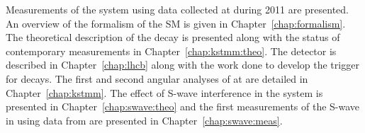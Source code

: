 Measurements of the \BdToKpimm system using data collected at \lhcb during 2011 are presented.
An overview of the formalism of the SM is given in Chapter~\ref{chap:formalism}. %
The theoretical description of the \BdToKpill decay is presented along with the status of contemporary measurements in  Chapter~\ref{chap:kstmm:theo}.
The \lhcb detector is described in Chapter~\ref{chap:lhcb} along with the work done to develop the trigger for \BdToKstmm decays.
The first and second angular analyses of \BdToKstmm at \lhcb %
are detailed in Chapter~\ref{chap:kstmm}.
The effect of S-wave interference in the \BdToKpill system is presented in Chapter~\ref{chap:swave:theo} and the first measurements of the 
\kpi S-wave in \BdToKpimm using data from \lhcb are presented in Chapter~\ref{chap:swave:meas}.
